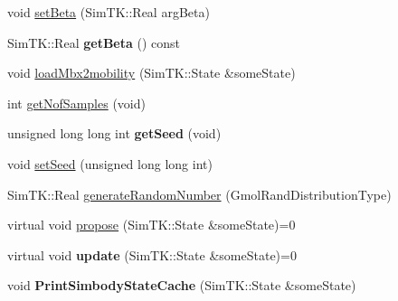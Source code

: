 \begin{DoxyCompactItemize}
\item 
void \hyperlink{classSampler_a3c0cbd43a89ee644ac462e3609c1d578}{set\+Beta} (Sim\+T\+K\+::\+Real arg\+Beta)
\item 
Sim\+T\+K\+::\+Real {\bfseries get\+Beta} () const \hypertarget{classSampler_aa811d3879623dfd9c855a8777b026a08}{}\label{classSampler_aa811d3879623dfd9c855a8777b026a08}

\item 
void \hyperlink{classSampler_a1e71eaf9562ef25a8dc27c53ca5e93f4}{load\+Mbx2mobility} (Sim\+T\+K\+::\+State \&some\+State)
\item 
int \hyperlink{classSampler_af3dfbb0921f97da86d0b0c3e51d58a47}{get\+Nof\+Samples} (void)
\item 
unsigned long long int {\bfseries get\+Seed} (void)\hypertarget{classSampler_a5ba75a69456c27778dcdb999169a0c0f}{}\label{classSampler_a5ba75a69456c27778dcdb999169a0c0f}

\item 
void \hyperlink{classSampler_ac9292ab10f2c4dd3a3626bab9819c923}{set\+Seed} (unsigned long long int)
\item 
Sim\+T\+K\+::\+Real \hyperlink{classSampler_a9d4455f6786a507dc856dd16117122d9}{generate\+Random\+Number} (Gmol\+Rand\+Distribution\+Type)
\item 
virtual void \hyperlink{classSampler_a3022d2efacf6107b3fba506d31e2919e}{propose} (Sim\+T\+K\+::\+State \&some\+State)=0
\item 
virtual void {\bfseries update} (Sim\+T\+K\+::\+State \&some\+State)=0\hypertarget{classSampler_a4887b45db93b240608a90712f856df69}{}\label{classSampler_a4887b45db93b240608a90712f856df69}

\item 
void {\bfseries Print\+Simbody\+State\+Cache} (Sim\+T\+K\+::\+State \&some\+State)\hypertarget{classSampler_abe095828aebb30121068fc338d0b43e0}{}\label{classSampler_abe095828aebb30121068fc338d0b43e0}

\end{DoxyCompactItemize}
